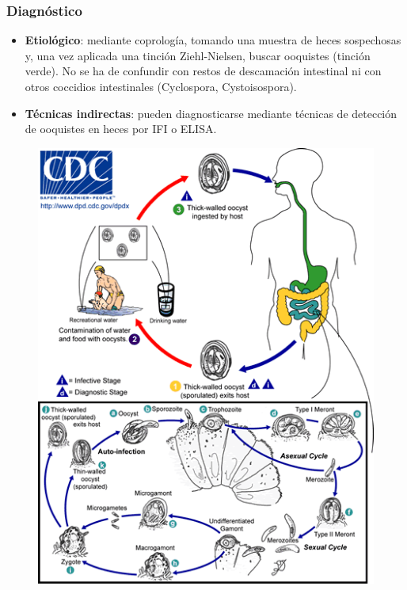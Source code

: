 \subsubsection{Diagnóstico}
\begin{itemize}[itemsep=0pt,parsep=0pt,topsep=0pt,partopsep=0pt]
	\item \textbf{Etiológico}: mediante coprología, tomando una muestra de heces sospechosas y, una vez aplicada una tinción Ziehl-Nielsen, buscar ooquistes (tinción verde). No se ha de confundir con restos de descamación intestinal ni con otros coccidios intestinales (Cyclospora, Cystoisospora).
	\item \textbf{Técnicas indirectas}: pueden diagnosticarse mediante técnicas de detección de ooquistes en heces por IFI o ELISA.
\end{itemize}
\begin{multicols}{2}
	\begin{figure}[H]
		\centering
		\includegraphics[width=\columnwidth]{A.imagenes/ACV-BioSan-Parasit-CparvumCbios}

\end{figure}
\end{multicols}
